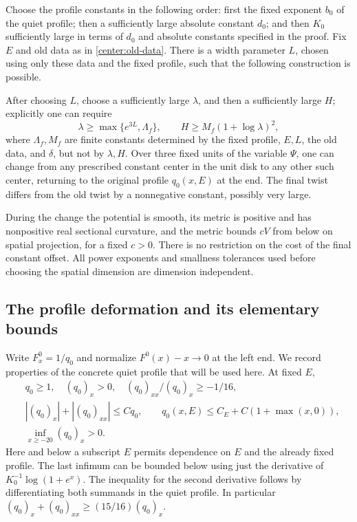 \begin{proposition}\label{center:change}
Choose the profile constants in the following order: first the fixed exponent $b_0$ of the quiet profile; then a sufficiently large absolute constant $d_0$; and then $K_0$ sufficiently large in terms of $d_0$ and absolute constants specified in the proof. Fix $E$ and old data as in \eqref{center:old-data}. There is a width parameter $L$, chosen using only these data and the fixed profile, such that the following construction is possible.

After choosing $L$, choose a sufficiently large $\lambda$, and then a sufficiently large $H$; explicitly one can require
\begin{equation}\label{center:target-order}
 \lambda\ge\max\{e^{3L},\Lambda_f\},
 \qquad H\ge M_f(1+\log\lambda)^2,
\end{equation}
where $\Lambda_f,M_f$ are finite constants determined by the fixed profile, $E,L$, the old data, and $\delta$, but not by $\lambda,H$. Over three fixed units of the variable $\Psi$, one can change from any prescribed constant center in the unit disk to any other such center, returning to the original profile $q_0(x,E)$ at the end. The final twist differs from the old twist by a nonnegative constant, possibly very large.

During the change the potential is smooth, its metric is positive and has nonpositive real sectional curvature, and the metric bounds $cV$ from below on spatial projection, for a fixed $c>0$. There is no restriction on the cost of the final constant offset. All power exponents and smallness tolerances used before choosing the spatial dimension are dimension independent.
\end{proposition}

\subsection{The profile deformation and its elementary bounds}

Write $F^0_x=1/q_0$ and normalize $F^0(x)-x\to0$ at the left end. We record properties of the concrete quiet profile that will be used here. At fixed $E$,
\begin{equation}\label{center:q-properties}
 \begin{split}
 &q_0\ge1,\quad (q_0)_x>0,\quad
       (q_0)_{xx}/(q_0)_x\ge-1/16,\\
 &|(q_0)_x|+|(q_0)_{xx}|\le C q_0,\qquad
       q_0(x,E)\le C_E+C(1+\max(x,0)),\\
 &\inf_{x\ge-20}(q_0)_x>0.
 \end{split}
\end{equation}
Here and below a subscript $E$ permits dependence on $E$ and the already fixed profile. The last infimum can be bounded below using just the derivative of $K_0^{-1}\log(1+e^x)$. The inequality for the second derivative follows by differentiating both summands in the quiet profile. In particular $(q_0)_x+(q_0)_{xx}\ge(15/16)(q_0)_x$.

